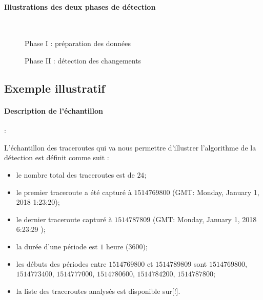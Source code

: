 \paragraph{ Illustrations des deux phases de détection}~
\newpage

\begin{figure}[H]
	\centering
	\captionsetup{justification=centering}
	\resizebox{!}{\textheight}{
		
	}
	\caption{Phase I : préparation des données }
	\label{fig:step-preparing-data}
\end{figure}

\begin{figure}[H]
	\centering
	\captionsetup{justification=centering}
	\resizebox{\textwidth}{\textheight}{
		
	}
	\caption{Phase II : détection des changements }
	\label{fig:step-detection-anomalies}
\end{figure}

\subsection{Exemple illustratif }

\paragraph{Description de  l'échantillon} :

L'échantillon des traceroutes qui va nous permettre d'illustrer l'algorithme de la détection est définit comme suit :

\begin{itemize}
	\item le nombre total des traceroutes est de $24$;
	\item le premier traceroute a été capturé à $1514769800$ (GMT: Monday, January 1, 2018 1:23:20);
	\item le dernier traceroute capturé à $1514787809$ (GMT: Monday, January 1, 2018 6:23:29 );
	\item la durée d'une période est $1$ heure ($3600$);
	\item les débuts des périodes entre $ 1514769800 $ et $ 1514789809 $ sont  $ 1514769800 $, $ 1514773400 $, $ 1514777000 $, $ 1514780600 $, $ 1514784200 $, $ 1514787800 $;
	\item la liste des traceroutes analysés est disponible sur[!].
\end{itemize} 



